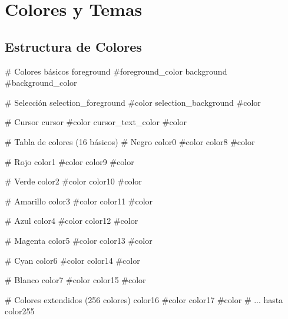 \documentclass[
  doc,
  floatsintext,
  longtable,
  a4paper,
  nolmodern,
  notxfonts,
  notimes,
  12pt,
  colorlinks=true,linkcolor=blue,citecolor=blue,urlcolor=blue]{apa7}
\newenvironment{Shaded}{\begin{snugshade}}{\end{snugshade}}
\newcommand{\CommentTok}[1]{\textcolor[rgb]{0.37,0.37,0.37}{#1}}
\newcommand{\DataTypeTok}[1]{\textcolor[rgb]{0.68,0.00,0.00}{#1}}
\begin{document}
\section{Colores y Temas}\label{colores-y-temas}

\subsection{Estructura de Colores}\label{estructura-de-colores}

\begin{Shaded}
\begin{Highlighting}[]
\CommentTok{\# Colores básicos}
\DataTypeTok{foreground} \CommentTok{\#foreground\_color}
\DataTypeTok{background} \CommentTok{\#background\_color}

\CommentTok{\# Selección}
\DataTypeTok{selection\_foreground} \CommentTok{\#color}
\DataTypeTok{selection\_background} \CommentTok{\#color}

\CommentTok{\# Cursor}
\DataTypeTok{cursor} \CommentTok{\#color}
\DataTypeTok{cursor\_text\_color} \CommentTok{\#color}

\CommentTok{\# Tabla de colores (16 básicos)}
\CommentTok{\# Negro}
\DataTypeTok{color0}  \CommentTok{\#color}
\DataTypeTok{color8}  \CommentTok{\#color}

\CommentTok{\# Rojo}
\DataTypeTok{color1}  \CommentTok{\#color}
\DataTypeTok{color9}  \CommentTok{\#color}

\CommentTok{\# Verde}
\DataTypeTok{color2}  \CommentTok{\#color}
\DataTypeTok{color10} \CommentTok{\#color}

\CommentTok{\# Amarillo}
\DataTypeTok{color3}  \CommentTok{\#color}
\DataTypeTok{color11} \CommentTok{\#color}

\CommentTok{\# Azul}
\DataTypeTok{color4}  \CommentTok{\#color}
\DataTypeTok{color12} \CommentTok{\#color}

\CommentTok{\# Magenta}
\DataTypeTok{color5}  \CommentTok{\#color}
\DataTypeTok{color13} \CommentTok{\#color}

\CommentTok{\# Cyan}
\DataTypeTok{color6}  \CommentTok{\#color}
\DataTypeTok{color14} \CommentTok{\#color}

\CommentTok{\# Blanco}
\DataTypeTok{color7}  \CommentTok{\#color}
\DataTypeTok{color15} \CommentTok{\#color}

\CommentTok{\# Colores extendidos (256 colores)}
\DataTypeTok{color16} \CommentTok{\#color}
\DataTypeTok{color17} \CommentTok{\#color}
\CommentTok{\# ... hasta color255}
\end{Highlighting}
\end{Shaded}
\end{document}
